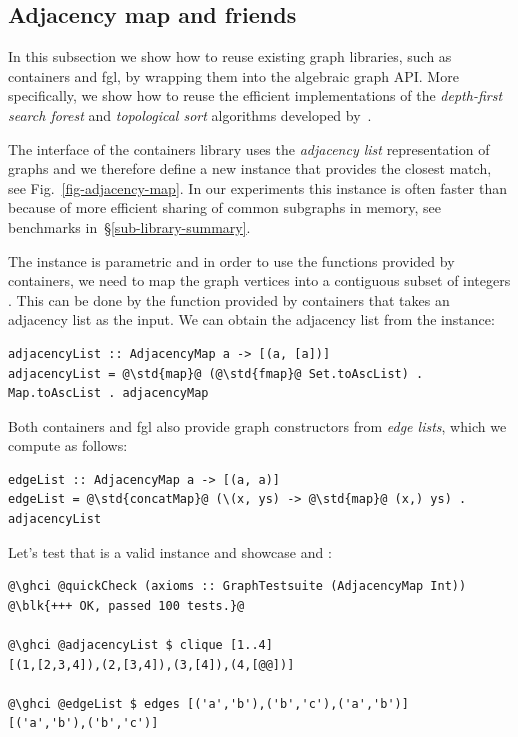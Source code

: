 \subsection{Adjacency map and friends}\label{sub-adjacency-map}

In this subsection we show how to reuse existing graph libraries, such as
\textsf{containers} and \textsf{fgl}, by wrapping them into the algebraic
graph API. More specifically, we show how to reuse the efficient implementations
of the \emph{depth-first search forest} and \emph{topological sort} algorithms
developed by~\citet{1995_king_graphs}.

The interface of the \textsf{containers} library uses the \emph{adjacency list}
representation of graphs and we therefore define a new  instance that
provides the closest match, see Fig.~\ref{fig-adjacency-map}. In our experiments
this instance is often faster than  because of more efficient
sharing of common subgraphs in memory, see benchmarks in~\S\ref{sub-library-summary}.

The  instance is parametric and in order to use the
functions provided by \textsf{containers}, we need to map the graph vertices
into a contiguous subset of integers . This can be done by the
 function provided by \textsf{containers} that takes an adjacency
list as the input. We can obtain the adjacency list from the 
instance:

\begin{verbatim}
adjacencyList :: AdjacencyMap a -> [(a, [a])]
adjacencyList = @\std{map}@ (@\std{fmap}@ Set.toAscList) . Map.toAscList . adjacencyMap
\end{verbatim}
Both \textsf{containers} and \textsf{fgl} also provide graph constructors from
\emph{edge lists}, which we compute as follows:

\begin{verbatim}
edgeList :: AdjacencyMap a -> [(a, a)]
edgeList = @\std{concatMap}@ (\(x, ys) -> @\std{map}@ (x,) ys) . adjacencyList
\end{verbatim}

\noindent
Let's test that  is a valid  instance and
showcase  and :

\begin{verbatim}
@\ghci @quickCheck (axioms :: GraphTestsuite (AdjacencyMap Int))
@\blk{+++ OK, passed 100 tests.}@

@\ghci @adjacencyList $ clique [1..4]
[(1,[2,3,4]),(2,[3,4]),(3,[4]),(4,[@@])]

@\ghci @edgeList $ edges [('a','b'),('b','c'),('a','b')]
[('a','b'),('b','c')]
\end{verbatim}

